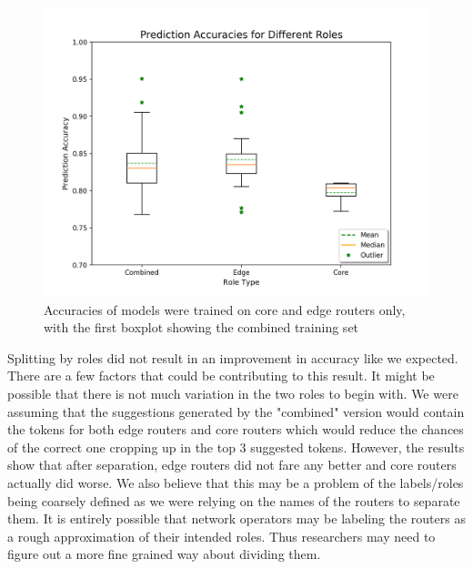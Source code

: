 \begin{figure}[H]
	\centering
	\includegraphics[width=\textwidth]{roles.png}
	\caption{Accuracies of models were trained on core and edge routers only, with the first boxplot showing the combined training set}
\end{figure}

Splitting by roles did not result in an improvement in accuracy like we expected. There are a few factors that could be contributing to this result. It might be possible that there is not much variation in the two roles to begin with. We were assuming that the suggestions generated by the "combined" version would contain the tokens for both edge routers and core routers which would reduce the chances of the correct one cropping up in the top 3 suggested tokens. However, the results show that after separation, edge routers did not fare any better and core routers actually did worse. We also believe that this may be a problem of the labels/roles being coarsely defined as we were relying on the names of the routers to separate them. It is entirely possible that network operators may be labeling the routers as a rough approximation of their intended roles. Thus researchers may need to figure out a more fine grained way about dividing them.

